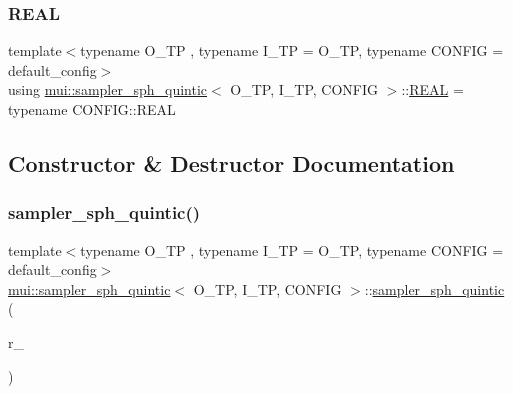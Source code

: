 \mbox{\label{classmui_1_1sampler__sph__quintic_ab47a0d5297b716d51c2ab6857f586103}} 
\subsubsection{\texorpdfstring{R\+E\+AL}{REAL}}
{\footnotesize\ttfamily template$<$typename O\+\_\+\+TP , typename I\+\_\+\+TP  = O\+\_\+\+TP, typename C\+O\+N\+F\+IG  = default\+\_\+config$>$ \\
using \hyperlink{classmui_1_1sampler__sph__quintic}{mui\+::sampler\+\_\+sph\+\_\+quintic}$<$ O\+\_\+\+TP, I\+\_\+\+TP, C\+O\+N\+F\+IG $>$\+::\hyperlink{classmui_1_1sampler__sph__quintic_ab47a0d5297b716d51c2ab6857f586103}{R\+E\+AL} =  typename C\+O\+N\+F\+I\+G\+::\+R\+E\+AL}



\subsection{Constructor \& Destructor Documentation}
\mbox{\label{classmui_1_1sampler__sph__quintic_a5440185ca454f8717d8a1b8ac7f46802}} 
\subsubsection{\texorpdfstring{sampler\+\_\+sph\+\_\+quintic()}{sampler\_sph\_quintic()}}
{\footnotesize\ttfamily template$<$typename O\+\_\+\+TP , typename I\+\_\+\+TP  = O\+\_\+\+TP, typename C\+O\+N\+F\+IG  = default\+\_\+config$>$ \\
\hyperlink{classmui_1_1sampler__sph__quintic}{mui\+::sampler\+\_\+sph\+\_\+quintic}$<$ O\+\_\+\+TP, I\+\_\+\+TP, C\+O\+N\+F\+IG $>$\+::\hyperlink{classmui_1_1sampler__sph__quintic}{sampler\+\_\+sph\+\_\+quintic} (\begin{DoxyParamCaption}\item[{\hyperlink{classmui_1_1sampler__sph__quintic_ab47a0d5297b716d51c2ab6857f586103}{R\+E\+AL}}]{r\+\_\+ }\end{DoxyParamCaption})\hspace{0.3cm}{\ttfamily [inline]}}



